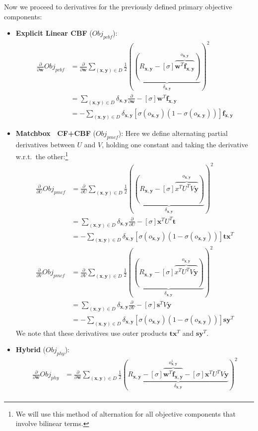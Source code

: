 \documentclass{sig-alternate}
\newcommand{\Obj}{\mathit{Obj}}
\newcommand{\pcbf}{\mathit{pcbf}}
\newcommand{\pmcf}{\mathit{pmcf}}
\newcommand{\phy}{\mathit{phy}}
\newcommand{\x}{\vec{x}}
\newcommand{\y}{\vec{y}}
\newcommand{\w}{\vec{w}}
\newcommand{\f}{\vec{f}}
\newcommand{\s}{\vec{s}}
\renewcommand{\t}{\vec{t}}
\renewcommand{\vec}[1]{\mathbf{#1}}
\begin{document}
Now we proceed to derivatives for the previously defined primary
objective components:
\begin{itemize}
\item {\bf Explicit Linear CBF} ($\Obj_\pcbf$):
\begin{align*}
\frac{\partial}{\partial \w} \Obj_\pcbf & = \frac{\partial}{\partial \w} \sum_{(\x,\y) \in D} \frac{1}{2} \left( \underbrace{(R_{\x,\y} - [\sigma] \overbrace{\w^T \f_{\x,\y}}^{o_{\x,\y}})}_{\delta_{\x,\y}} \right)^2\\
& = \sum_{(\x,\y) \in D} \delta_{\x,\y} \frac{\partial}{\partial \w} - [\sigma] \w^T \f_{\x,\y}\\
& = - \sum_{(\x,\y) \in D} \delta_{\x,\y} [\sigma(o_{\x,\y}) (1 - \sigma(o_{\x,\y}))] \f_{\x,\y}
\end{align*}
\item {\bf Matchbox~\cite{matchbox} CF+CBF} ($\Obj_\pmcf$):
Here we define alternating partial derivatives between $U$ and $V$, holding one
constant and taking the derivative w.r.t.\ the other:\footnote{We will use
this method of alternation for all objective components that involve bilinear
terms.}
\begin{align*}
\frac{\partial}{\partial U} \Obj_\pmcf & = \frac{\partial}{\partial U} \sum_{(\x,\y) \in D} \frac{1}{2} \left( \underbrace{(R_{\x,\y} - [\sigma] \overbrace{x^T U^T V\y}^{o_{\x,\y}})}_{\delta_{\x,\y}} \right)^2\\
& = \sum_{(\x,\y) \in D} \delta_{\x,\y} \frac{\partial}{\partial U} - [\sigma] \x^T U^T \t \\
& = - \sum_{(\x,\y) \in D} \delta_{\x,\y} [\sigma(o_{\x,\y}) (1 - \sigma(o_{\x,\y}))] \t \x^T \\
\frac{\partial}{\partial V} \Obj_\pmcf & = \frac{\partial}{\partial V} \sum_{(\x,\y) \in D} \frac{1}{2} \left( \underbrace{(R_{\x,\y} - [\sigma] \overbrace{x^T U^T V\y}^{o_{\x,\y}})}_{\delta_{\x,\y}} \right)^2\\
& = \sum_{(\x,\y) \in D} \delta_{\x,\y} \frac{\partial}{\partial V} - [\sigma] \s^T V \y \\
& = - \sum_{(\x,\y) \in D} \delta_{\x,\y} [\sigma(o_{\x,\y}) (1 - \sigma(o_{\x,\y}))] \s \y^T
\end{align*}
We note that these derivatives use outer products $\t \x^T$ and $\s \y^T$.
\item {\bf Hybrid} ($\Obj_\phy$):
\begin{align*}
\frac{\partial}{\partial \w} \Obj_\phy & = \frac{\partial}{\partial \w} \sum_{(\x,\y) \in D} \frac{1}{2} \left( \underbrace{R_{\x,\y} - [\sigma] \overbrace{\w^T \f_{\x,\y}}^{o^1_{\x,\y}} - [\sigma] \x^T U^T V\y}_{\delta_{\x,\y}} \right)^2 \\

\end{align*}
\end{itemize}
\end{document}
